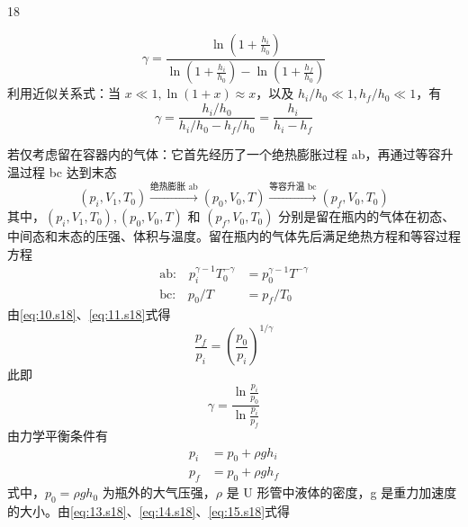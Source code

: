 \begin{solution}{18}
\begin{subsolution}
        \begin{equation}
            \gamma = \frac{\ln \left(1 + \frac{h_i}{h_0}\right)}{\ln \left(1 + \frac{h_i}{h_0}\right) - \ln \left(1 + \frac{h_f}{h_0}\right)}
            \label{eq:8.s18}
        \end{equation}
        利用近似关系式：当 $x \ll 1, \ln(1 + x) \approx x$，以及 $h_i / h_0 \ll 1, h_f / h_0 \ll 1$，有
        \begin{equation}
            \gamma = \frac{h_i / h_0}{h_i / h_0 - h_f / h_0} = \frac{h_i}{h_i - h_f}
            \label{eq:9.s18}
        \end{equation}
    \end{subsolution}
    \begin{subsolution}
        若仅考虑留在容器内的气体：它首先经历了一个绝热膨胀过程 ab，再通过等容升温过程 bc 达到末态
        \begin{equation*}
            (p_i, V_1, T_0) \xrightarrow{\text{绝热膨胀 ab}} (p_0, V_0, T) \xrightarrow{\text{等容升温 bc}} (p_f, V_0, T_0)
        \end{equation*}
        其中，$(p_i, V_1, T_0), (p_0, V_0, T)$ 和 $(p_f, V_0, T_0)$ 分别是留在瓶内的气体在初态、中间态和末态的压强、体积与温度。留在瓶内的气体先后满足绝热方程和等容过程方程
        \begin{align}
            \text{ab:} \quad p_i^{\gamma - 1} T_0^{-\gamma} &= p_0^{\gamma - 1} T^{-\gamma} \label{eq:10.s18} \\
            \text{bc:} \quad p_0 / T &= p_f / T_0 \label{eq:11.s18}
        \end{align}
        由\eqref{eq:10.s18}、\eqref{eq:11.s18}式得
        \begin{equation}
            \frac{p_f}{p_i} = \left(\frac{p_0}{p_i}\right)^{1/\gamma}
            \label{eq:12.s18}
        \end{equation}
        此即
        \begin{equation}
            \gamma = \frac{\ln \frac{p_i}{p_0}}{\ln \frac{p_i}{p_f}}
            \label{eq:13.s18}
        \end{equation}
        由力学平衡条件有
        \begin{align}
            p_i &= p_0 + \rho g h_i \label{eq:14.s18} \\
            p_f &= p_0 + \rho g h_f \label{eq:15.s18}
        \end{align}
        式中，$p_0 = \rho g h_0$ 为瓶外的大气压强，$\rho$ 是 U 形管中液体的密度，g 是重力加速度的大小。由\eqref{eq:13.s18}、\eqref{eq:14.s18}、\eqref{eq:15.s18}式得

\end{subsolution}
\end{solution}
